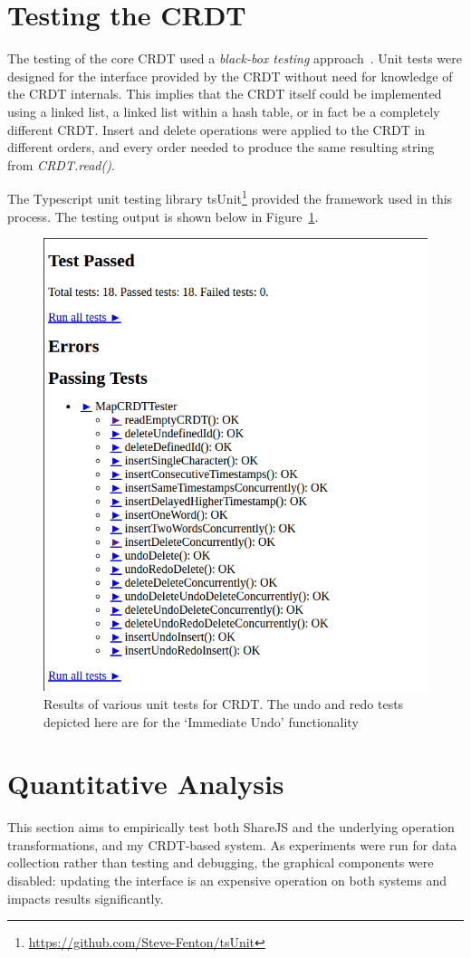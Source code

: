 \documentclass[12pt,a4paper,twoside,openright]{report}
\begin{document}
	
	\section{Testing the CRDT}
	
	The testing of the core CRDT used a \textit{black-box testing} approach~\cite{Patton}. Unit tests were designed for the interface provided by the CRDT without need for knowledge of the CRDT internals. This implies that the CRDT itself could be implemented using a linked list, a linked list within a hash table, or in fact be a completely different CRDT. Insert and delete operations were applied to the CRDT in different orders, and every order needed to produce the same resulting string from \textit{CRDT.read()}.
	
	The Typescript unit testing library tsUnit\footnote{\url{https://github.com/Steve-Fenton/tsUnit}} provided the framework used in this process. The testing output is shown below in Figure~\ref{fig:unittests}.

	\begin{figure}[htb]
	\centering
	\includegraphics[width=0.56\linewidth]{figs/unittests.png}
	\caption[Unit tests for CRDT]{Results of various unit tests for CRDT. The undo and redo tests depicted here are for the `Immediate Undo' functionality}
	\label{fig:unittests}
	\end{figure}
	
	
	
	
	\section{Quantitative Analysis} \label{sec:quanteval}
	
		This section aims to empirically test both ShareJS and the underlying operation transformations, and my CRDT-based system. As experiments were run for data collection rather than testing and debugging, the graphical components were disabled: updating the interface is an expensive operation on both systems and impacts results significantly.
		
\end{document}
